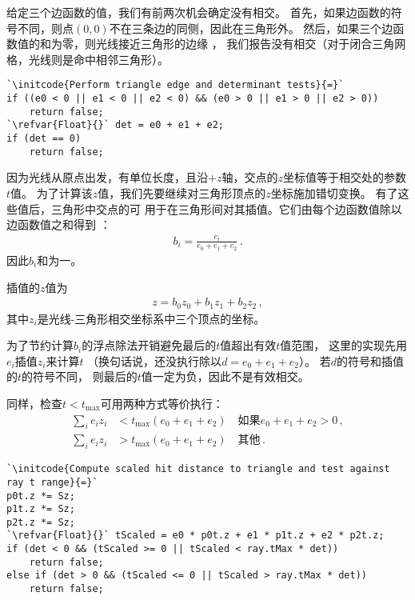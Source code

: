 给定三个边函数的值，我们有前两次机会确定没有相交。
首先，如果边函数的符号不同，则点$(0,0)$不在三条边的同侧，因此在三角形外。
然后，如果三个边函数值的和为零，则光线接近三角形的边缘
，
我们报告没有相交（对于闭合三角网格，光线则是命中相邻三角形）。
\begin{lstlisting}
`\initcode{Perform triangle edge and determinant tests}{=}`
if ((e0 < 0 || e1 < 0 || e2 < 0) && (e0 > 0 || e1 > 0 || e2 > 0))
    return false;
`\refvar{Float}{}` det = e0 + e1 + e2;
if (det == 0)
    return false;
\end{lstlisting}

因为光线从原点出发，有单位长度，且沿$+z$轴，交点的$z$坐标值等于相交处的参数$t$值。
为了计算该$z$值，我们先要继续对三角形顶点的$z$坐标施加错切变换。
有了这些值后，三角形中交点的可
用于在三角形间对其插值。它们由每个边函数值除以边函数值之和得到
：
\begin{align*}
    b_i=\frac{e_i}{e_0+e_1+e_2}\, .
\end{align*}
因此$b_i$和为一。

插值的$z$值为
\begin{align*}
    z=b_0z_0+b_1z_1+b_2z_2\, ,
\end{align*}
其中$z_i$是光线-三角形相交坐标系中三个顶点的坐标。

为了节约计算$b_i$的浮点除法开销避免最后的$t$值超出有效$t$值范围，
这里的实现先用$e_i$插值$z_i$来计算$t$
（换句话说，还没执行除以$d=e_0+e_1+e_2$）。
若$d$的符号和插值的$t$的符号不同，
则最后的$t$值一定为负，因此不是有效相交。

同样，检查$t<t_{\max}$可用两种方式等价执行：
\begin{align*}
    \sum\limits_i{e_iz_i} & <t_{\max}(e_0+e_1+e_2)\quad\text{如果}e_0+e_1+e_2>0\, , \\
    \sum\limits_i{e_iz_i} & >t_{\max}(e_0+e_1+e_2)\quad\text{其他}\, .
\end{align*}
\begin{lstlisting}
`\initcode{Compute scaled hit distance to triangle and test against ray t range}{=}`
p0t.z *= Sz;
p1t.z *= Sz;
p2t.z *= Sz;
`\refvar{Float}{}` tScaled = e0 * p0t.z + e1 * p1t.z + e2 * p2t.z;
if (det < 0 && (tScaled >= 0 || tScaled < ray.tMax * det))
    return false;
else if (det > 0 && (tScaled <= 0 || tScaled > ray.tMax * det))
    return false;
\end{lstlisting}

